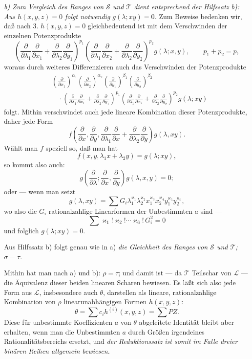 \emph{b) Zum Vergleich des Ranges von $\mathcal S$ und $\mathcal T$ dient entsprechend der Hilfssatz b): Aus $h(x,y,z)=0$ folgt notwendig $g(\lambda;xy)=0$.} Zum Beweise bedenken wir, daß nach 3. $h(x,y,z)=0$ gleichbedeutend ist mit dem Verschwinden der einzelnen Potenzprodukte
\[
 \left(\frac{\partial}{\partial\lambda_1}\frac{\partial}{\partial x_1}
 +\frac{\partial}{\partial\lambda_2}\frac{\partial}{\partial y_1}\right)^{p_1}
 \left(\frac{\partial}{\partial\lambda_1}\frac{\partial}{\partial x_2}
 +\frac{\partial}{\partial\lambda_2}\frac{\partial}{\partial y_2}\right)^{p_2}g(\lambda;x,y),
 \qquad p_1+p_2=p,
\]
woraus durch weiteres Differenzieren auch das Verschwinden der Potenzprodukte
\[
\begin{aligned}
&\left(\frac{\partial}{\partial x_1}\right)^{\alpha_1}
 \left(\frac{\partial}{\partial x_2}\right)^{\alpha_2}
 \left(\frac{\partial}{\partial y_1}\right)^{\beta_1}
 \left(\frac{\partial}{\partial y_2}\right)^{\beta_2} \\
&\quad\cdot
 \left(\frac{\partial}{\partial\lambda_1}\frac{\partial}{\partial x_1}
 +\frac{\partial}{\partial\lambda_2}\frac{\partial}{\partial y_1}\right)^{p_1}
 \left(\frac{\partial}{\partial\lambda_1}\frac{\partial}{\partial x_2}
 +\frac{\partial}{\partial\lambda_2}\frac{\partial}{\partial y_2}\right)^{p_2}
 g(\lambda;xy)
\end{aligned}
\]
folgt. Mithin verschwindet auch jede lineare Kombination dieser Potenzprodukte, daher jede Form
\[
  f\left(\frac{\partial}{\partial x},\frac{\partial}{\partial y},
  \frac{\partial}{\partial\lambda_1}\frac{\partial}{\partial x}
  +\frac{\partial}{\partial\lambda_2}\frac{\partial}{\partial y}\right)g(\lambda,xy).
\]
Wählt man $f$ speziell so, daß man hat
\[
  f(x,y,\lambda_1x+\lambda_2y)=g(\lambda;xy),
\]
so kommt also auch:
\[
  g\left(\frac{\partial}{\partial\lambda};
    \frac{\partial}{\partial x},
    \frac{\partial}{\partial y}\right)g(\lambda,x,y)=0;
\]
oder --- wenn man setzt
\[
  g(\lambda,xy)=\sum G_i\lambda_1^{\varkappa_1}\lambda_2^{\varkappa_2}
  x_1^{\varkappa_3}x_2^{\varkappa_4}y_1^{\varkappa_5}y_2^{\varkappa_6},
\]
wo also die $G_i$ rationalzahlige Linearformen der Unbestimmten $a$ sind ---
\[
  \sum \varkappa_1!\varkappa_2!\cdots\varkappa_6!\,G_i^2=0
\]
und folglich $g(\lambda;xy)=0$.

Aus Hilfssatz b) folgt genau wie in a) \emph{die Gleichheit des Ranges von $\mathcal S$ und $\mathcal T$; $\sigma=\tau$.}

Mithin hat man nach a) und b): $\rho=\tau$; und damit ist --- da $\mathcal T$ Teilschar von $\mathcal L$ --- die Äquivalenz dieser beiden linearen Scharen bewiesen. Es läßt sich also jede Form aus $\mathcal L$, insbesondere auch $\theta$, darstellen als lineare, rationalzahlige Kombination von $\rho$ linearunabhängigen Formen $h(x,y,z)$:
\[
  \theta=\sum c_i h^{(i)}(x,y,z)=\sum PZ.
\]
Diese für unbestimmte Koeffizienten $a$ von $\theta$ abgeleitete Identität bleibt aber erhalten, wenn man die Unbestimmten $a$ durch Größen irgendeines Rationalitätsbereichs ersetzt, und \emph{der Reduktionssatz ist somit im Falle dreier binären Reihen allgemein bewiesen.}

